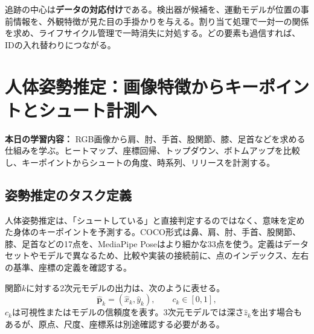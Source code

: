 \documentclass[11pt,a4paper,oneside]{report}
\begin{document}
\begin{takeawayBox}
追跡の中心は\textbf{データの対応付け}である。検出器が候補を、運動モデルが位置の事前情報を、外観特徴が見た目の手掛かりを与える。割り当て処理で一対一の関係を求め、ライフサイクル管理で一時消失に対処する。どの要素も過信すれば、IDの入れ替わりにつながる。
\end{takeawayBox}

\endgroup

\chapter{人体姿勢推定：画像特徴からキーポイントとシュート計測へ}

\begin{heroBox}
\textbf{本日の学習内容：}\quad
RGB画像から肩、肘、手首、股関節、膝、足首などを求める仕組みを学ぶ。ヒートマップ、座標回帰、トップダウン、ボトムアップを比較し、キーポイントからシュートの角度、時系列、リリースを計測する。
\end{heroBox}

\section{姿勢推定のタスク定義}

人体姿勢推定は、「シュートしている」と直接判定するのではなく、意味を定めた身体のキーポイントを予測する。COCO形式は鼻、肩、肘、手首、股関節、膝、足首などの17点を、MediaPipe Poseはより細かな33点を使う。定義はデータセットやモデルで異なるため、比較や実装の接続前に、点のインデックス、左右の基準、座標の定義を確認する。

関節$k$に対する2次元モデルの出力は、次のように表せる。
\[
\hat{\mathbf p}_k=(\hat{x}_k,\hat{y}_k),\qquad c_k\in[0,1],
\]
$c_k$は可視性またはモデルの信頼度を表す。3次元モデルでは深さ$\hat z_k$を出す場合もあるが、原点、尺度、座標系は別途確認する必要がある。
\end{document}
